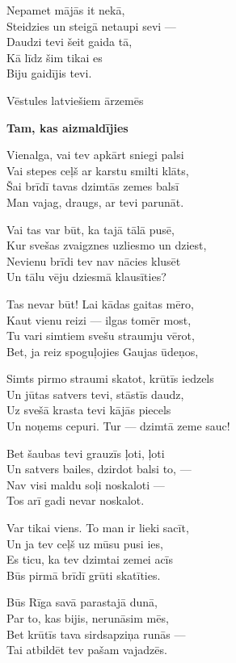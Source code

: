 \documentclass[14pt]{extarticle}
\begin{document}
{{Nepamet mājās it nekā,\\
Steidzies un steigā netaupi sevi ---\\
Daudzi tevi šeit gaida tā,\\
Kā līdz šim tikai es\\
Biju gaidījis tevi. 

\newpage

{\large \sc Vēstules latviešiem ārzemēs}

{\bf Tam, kas aizmaldījies}

Vienalga, vai tev apkārt sniegi palsi\\
Vai stepes ceļš ar karstu smilti klāts,\\
Šai brīdī tavas dzimtās zemes balsī\\
Man vajag, draugs, ar tevi parunāt. 

Vai tas var būt, ka tajā tālā pusē,\\
Kur svešas zvaigznes uzliesmo un dziest,\\
Nevienu brīdi tev nav nācies klusēt\\
Un tālu vēju dziesmā klausīties?

Tas nevar būt! Lai kādas gaitas mēro,\\
Kaut vienu reizi --- ilgas tomēr most,\\
Tu vari simtiem svešu straumju vērot,\\
Bet, ja reiz spoguļojies Gaujas ūdeņos,

Simts pirmo straumi skatot, krūtīs iedzels\\
Un jūtas satvers tevi, stāstīs daudz,\\
Uz svešā krasta tevi kājās piecels\\
Un noņems cepuri. Tur --- dzimtā zeme sauc!

Bet šaubas tevi grauzīs ļoti, ļoti\\
Un satvers bailes, dzirdot balsi to, ---\\
Nav visi maldu soļi noskaloti ---\\
Tos arī gadi nevar noskalot. 

Var tikai viens. To man ir lieki sacīt,\\
Un ja tev ceļš uz mūsu pusi ies,\\
Es ticu, ka tev dzimtai zemei acīs\\
Būs pirmā brīdī grūti skatīties.

Būs Rīga savā parastajā dunā,\\
Par to, kas bijis, nerunāsim mēs,\\
Bet krūtīs tava sirdsapziņa runās ---\\
Tai atbildēt tev pašam vajadzēs. 

}}
\end{document}
